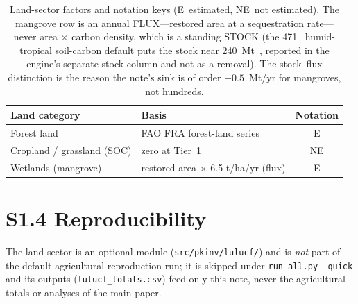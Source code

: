 \begin{table}[!htbp]
\centering
\footnotesize
\begin{tabular}{@{}llc@{}}
\toprule
\textbf{Land category} & \textbf{Basis} & \textbf{Notation} \\
\midrule
Forest land            & FAO FRA forest-land series & E \\
Cropland / grassland (SOC) & zero at Tier~1 & NE \\
Wetlands (mangrove)    & restored area $\times$ 6.5 t\COtwo{}/ha/yr (flux) & E \\
\bottomrule
\end{tabular}
\caption{Land-sector factors and notation keys (E~estimated, NE~not estimated). The
mangrove row is an annual FLUX---restored area at a sequestration rate---never area
$\times$ carbon density, which is a standing STOCK (the 471~\tCha{} humid-tropical
soil-carbon default puts the stock near 240~Mt~\COe{}, reported in the engine's
separate stock column and not as a removal). The stock--flux distinction is the reason
the note's sink is of order $-0.5$~Mt/yr for mangroves, not hundreds.}
\label{tab:s1land}
\end{table}

\section*{S1.4 Reproducibility}

The land sector is an optional module (\texttt{src/pkinv/lulucf/}) and is \emph{not} part of the default
agricultural reproduction run; it is skipped under \texttt{run\_all.py --quick} and its outputs
(\texttt{lulucf\_totals.csv}) feed only this note, never the agricultural totals or analyses of the main
paper.
